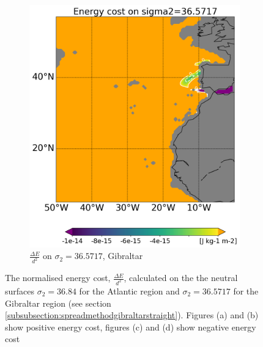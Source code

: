 \begin{figure}[htbp]
\begin{subfigure}[b]{0.4\textwidth}
         \includegraphics[width=\textwidth]{plots/energy/gibraltar_energy/Map2dcyl_neg_energy_on_sigma2_3657e-2_reg310Eto360E05Nto57N_1990to1998av_WOCE.png}
         \caption{$\frac{\Delta E}{d^2}$ on $\sigma_2 = 36.5717$, Gibraltar}
         \label{fig:subplot_gibraltar_neg_energy_sigma_2}
     \end{subfigure}
     
    \caption{The normalised energy cost, $\frac{\Delta E}{d^2}$, calculated on the the neutral surfaces $\sigma_2 = 36.84$ for the Atlantic region and  $\sigma_2 = 36.5717$ for the Gibraltar region (see section \ref{subsubsection:spreadmethodgibraltarstraight}). Figures (a) and (b) show positive energy cost, figures (c) and (d) show negative energy cost}
    \label{fig:energy_sigma_2}
    
\end{figure}

